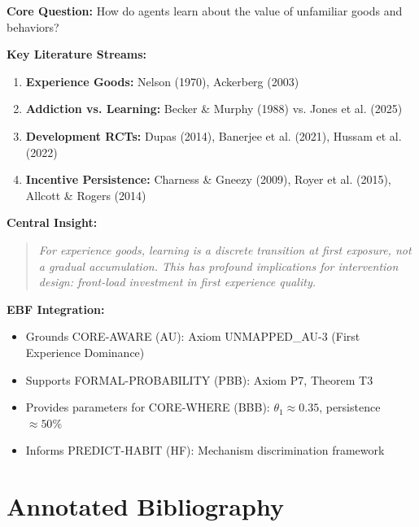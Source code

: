 \documentclass[11pt, a4paper]{article}
\begin{document}
\begin{tcolorbox}[colback=green!10!white, colframe=green!75!black,
    title=\textbf{Appendix XIX: Summary}]

\textbf{Core Question:} How do agents learn about the value of unfamiliar goods and behaviors?

\textbf{Key Literature Streams:}
\begin{enumerate}[nosep]
    \item \textbf{Experience Goods:} Nelson (1970), Ackerberg (2003)
    \item \textbf{Addiction vs. Learning:} Becker \& Murphy (1988) vs. Jones et al. (2025)
    \item \textbf{Development RCTs:} Dupas (2014), Banerjee et al. (2021), Hussam et al. (2022)
    \item \textbf{Incentive Persistence:} Charness \& Gneezy (2009), Royer et al. (2015), Allcott \& Rogers (2014)
\end{enumerate}

\textbf{Central Insight:}
\begin{quote}
\textit{For experience goods, learning is a discrete transition at first exposure, not a gradual accumulation. This has profound implications for intervention design: front-load investment in first experience quality.}
\end{quote}

\textbf{EBF Integration:}
\begin{itemize}[nosep]
    \item Grounds CORE-AWARE (AU): Axiom UNMAPPED_AU-3 (First Experience Dominance)
    \item Supports FORMAL-PROBABILITY (PBB): Axiom P7, Theorem T3
    \item Provides parameters for CORE-WHERE (BBB): $\theta_1 \approx 0.35$, persistence $\approx 50\%$
    \item Informs PREDICT-HABIT (HF): Mechanism discrimination framework
\end{itemize}

\end{tcolorbox}


\section{Annotated Bibliography}
\label{sec:lrn-bibliography}
\end{document}
